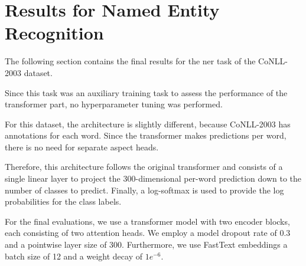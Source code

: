 \section{Results for Named Entity Recognition}

The following section contains the final results for the \acrfull{ner} task of the CoNLL-2003 dataset.

Since this task was an auxiliary training task to assess the performance of the transformer part, no hyperparameter tuning was performed.
\medskip

For this dataset, the architecture is slightly different, because CoNLL-2003 has annotations for each word. Since the transformer makes predictions per word, there is no need for separate aspect heads.

Therefore, this architecture follows the original transformer and consists of a single linear layer to project the 300-dimensional per-word prediction down to the number of classes to predict. Finally, a log-softmax is used to provide the log probabilities for the class labels.
\medskip

For the final evaluations, we use a transformer model with two encoder blocks, each consisting of two attention heads. We employ a model dropout rate of 0.3 and a pointwise layer size of 300. Furthermore, we use FastText embeddings a batch size of 12 and a weight decay of $1e^{-6}$.

